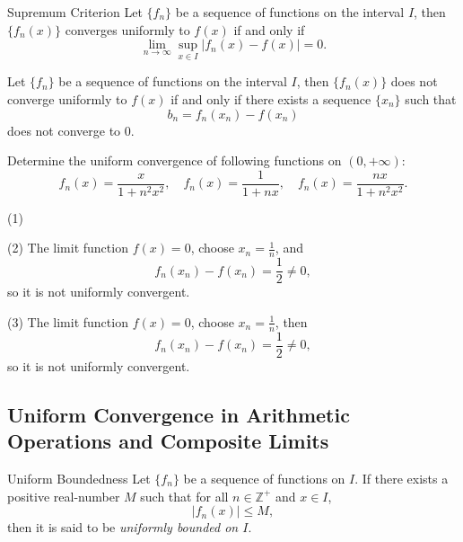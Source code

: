 \begin{theorem}{Supremum Criterion}{}
  Let $\{f_n\}$ be a sequence of functions on the interval $I$, then
  $\{f_n(x)\}$ converges uniformly to $f(x)$ if and only if
  \begin{equation}
    \lim \limits _{n \rightarrow \infty} \sup \limits_{x \in I} |f_n(x) - f(x)| = 0.
  \end{equation}
\end{theorem}

\begin{corollary}{}{}
  Let $\{f_n\}$ be a sequence of functions on the interval $I$, then
  $\{f_n(x)\}$ does not converge uniformly to $f(x)$ if and only if
  there exists a sequence $\{x_n\}$ such that
  \begin{equation}
    b_n = f_n(x_n) - f(x_n)
  \end{equation}
  does not converge to $0$.
\end{corollary}

\begin{example}{}{}
  Determine the uniform convergence of following functions on $(0, +\infty)$:
  \begin{equation}
    f_n(x) = \frac{x}{1 + n^2x^2}, \quad
    f_n(x) = \frac{1}{1+nx}, \quad
    f_n(x) = \frac{nx}{1+n^2x^2}.
  \end{equation}
\end{example}

\begin{solution}
  (1)

  (2) The limit function $f(x) = 0$, choose $x_n = \frac{1}{n}$, and
  \begin{equation}
    f_n(x_n) - f(x_n) = \frac{1}{2} \neq 0,
  \end{equation}
  so it is not uniformly convergent.

  (3) The limit function $f(x) = 0$, choose $x_n = \frac{1}{n}$, then
  \begin{equation}
    f_n(x_n) - f(x_n) = \frac{1}{2} \neq 0,
  \end{equation}
  so it is not uniformly convergent.
\end{solution}


\subsection{Uniform Convergence in Arithmetic Operations and Composite Limits}

\begin{definition}{Uniform Boundedness}{}
  Let $\{f_n\}$ be a sequence of functions on $I$.
  If there exists a positive real-number $M$ such that for all $n \in \mathbb{Z}^+$ and $x \in I$,
  \begin{equation}
    |f_n(x)| \leq M,
  \end{equation}
  then it is said to be \emph{uniformly bounded on $I$}.
\end{definition}

